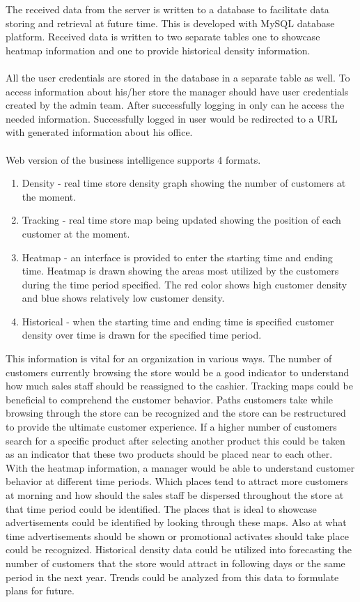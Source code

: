 \documentclass[12pt,a4paper]{report}
\begin{document}
The received data from the server is written to a database to facilitate data storing and retrieval at future time. This is developed with MySQL database platform. Received data is written to two separate tables one to showcase heatmap information and one to provide historical density information. \\\\
All the user credentials are stored in the database in a separate table as well. To access information about his/her store the manager should have user credentials created by the admin team. After successfully logging in only can he access the needed information. Successfully logged in user would be redirected to a URL with generated information about his office.\\\\
Web version of the business intelligence supports 4 formats.
\begin{enumerate}

\item Density - real time store density graph showing the number of customers at the moment.
\item Tracking - real time store map being updated showing the position of each customer at the moment.

\item Heatmap - an interface is provided to enter the starting time and ending time. Heatmap is drawn showing the areas most utilized by the customers during the time period specified. The red color shows high customer density and blue shows relatively low customer density.

\item Historical - when the starting time and ending time is specified customer density over time is drawn for the specified time period. 

\end{enumerate}

This information is vital for an organization in various ways. The number of customers currently browsing the store would be a good indicator to understand how much sales staff should be reassigned to the cashier. Tracking maps could be beneficial to comprehend the customer behavior. Paths customers take while browsing through the store can be recognized and the store can be restructured to provide the ultimate customer experience. If a higher number of customers search for a specific product after selecting another product this could be taken as an indicator that these two products should be placed near to each other. With the heatmap information, a manager would be able to understand customer behavior at different time periods. Which places tend to attract more customers at morning and how should the sales staff be dispersed throughout the store at that time period could be identified. The places that is ideal to showcase advertisements could be identified by looking through these maps. Also at what time advertisements should be shown or promotional activates should take place could be recognized. Historical density data could be utilized into forecasting the number of customers that the store would attract in following days or the same period in the next year. Trends could be analyzed from this data to formulate plans for future. 
\end{document}
